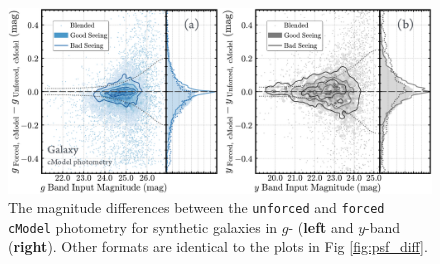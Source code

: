 \documentclass[useamsfonts]{pasj01}
\def\cmodel{\texttt{cModel}}
\def\forced{\texttt{forced}}
\def\unforced{\texttt{unforced}}
\begin{document}
\begin{figure}
    \begin{center}
        \includegraphics[width=\textwidth]{fig/synpipe_cmodel_diff}
    \end{center}
    \caption{
        The magnitude differences between the \unforced{} and \forced{}
        \cmodel{} photometry for synthetic galaxies in $g$- (\textbf{left} and
        $y$-band (\textbf{right}).
        Other formats are identical to the plots in Fig \ref{fig:psf_diff}.
        }
    \label{fig:cmodel_diff}
\end{figure}
\end{document}
